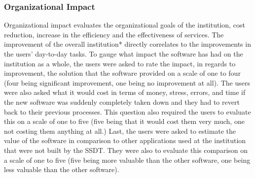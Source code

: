 \paragraph{}

\subsubsection{Organizational Impact}
Organizational impact evaluates the organizational goals of the institution, cost reduction, increase in the efficiency and the effectiveness of services. The improvement of the overall institution* directly correlates to the improvements in the users' day-to-day tasks. To gauge what impact the software has had on the institution as a whole, the users were asked to rate the impact, in regards to improvement, the solution that the software provided on a scale of one to four (four being significant improvement, one being no improvement at all). The users were also asked what it would cost in terms of money, stress, errors, and time if the new software was suddenly completely taken down and they had to revert back to their previous processes. This question also required the users to evaluate this on a scale of one to five (five being that it would cost them very much, one not costing them anything at all.) Last, the users were asked to estimate the value of the software in comparison to other applications used at the institution that were not built by the SSDT. They were also to evaluate this comparison on a scale of one to five (five being more valuable than the other software, one being less valuable than the other software).

\paragraph{}



